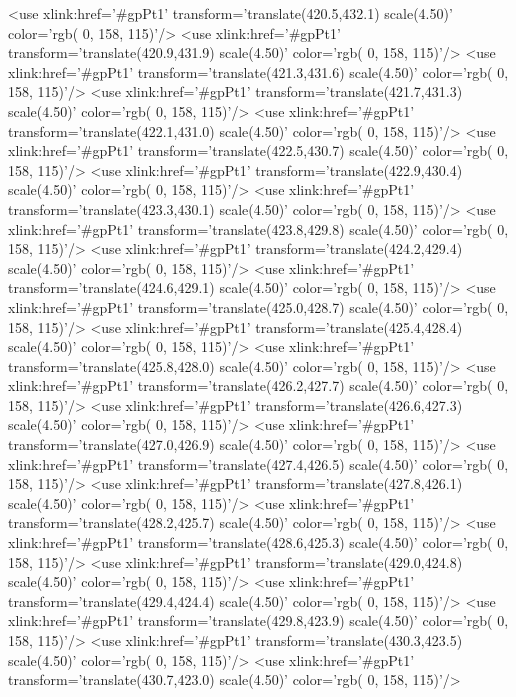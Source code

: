 	<use xlink:href='#gpPt1' transform='translate(420.5,432.1) scale(4.50)' color='rgb(  0, 158, 115)'/>
	<use xlink:href='#gpPt1' transform='translate(420.9,431.9) scale(4.50)' color='rgb(  0, 158, 115)'/>
	<use xlink:href='#gpPt1' transform='translate(421.3,431.6) scale(4.50)' color='rgb(  0, 158, 115)'/>
	<use xlink:href='#gpPt1' transform='translate(421.7,431.3) scale(4.50)' color='rgb(  0, 158, 115)'/>
	<use xlink:href='#gpPt1' transform='translate(422.1,431.0) scale(4.50)' color='rgb(  0, 158, 115)'/>
	<use xlink:href='#gpPt1' transform='translate(422.5,430.7) scale(4.50)' color='rgb(  0, 158, 115)'/>
	<use xlink:href='#gpPt1' transform='translate(422.9,430.4) scale(4.50)' color='rgb(  0, 158, 115)'/>
	<use xlink:href='#gpPt1' transform='translate(423.3,430.1) scale(4.50)' color='rgb(  0, 158, 115)'/>
	<use xlink:href='#gpPt1' transform='translate(423.8,429.8) scale(4.50)' color='rgb(  0, 158, 115)'/>
	<use xlink:href='#gpPt1' transform='translate(424.2,429.4) scale(4.50)' color='rgb(  0, 158, 115)'/>
	<use xlink:href='#gpPt1' transform='translate(424.6,429.1) scale(4.50)' color='rgb(  0, 158, 115)'/>
	<use xlink:href='#gpPt1' transform='translate(425.0,428.7) scale(4.50)' color='rgb(  0, 158, 115)'/>
	<use xlink:href='#gpPt1' transform='translate(425.4,428.4) scale(4.50)' color='rgb(  0, 158, 115)'/>
	<use xlink:href='#gpPt1' transform='translate(425.8,428.0) scale(4.50)' color='rgb(  0, 158, 115)'/>
	<use xlink:href='#gpPt1' transform='translate(426.2,427.7) scale(4.50)' color='rgb(  0, 158, 115)'/>
	<use xlink:href='#gpPt1' transform='translate(426.6,427.3) scale(4.50)' color='rgb(  0, 158, 115)'/>
	<use xlink:href='#gpPt1' transform='translate(427.0,426.9) scale(4.50)' color='rgb(  0, 158, 115)'/>
	<use xlink:href='#gpPt1' transform='translate(427.4,426.5) scale(4.50)' color='rgb(  0, 158, 115)'/>
	<use xlink:href='#gpPt1' transform='translate(427.8,426.1) scale(4.50)' color='rgb(  0, 158, 115)'/>
	<use xlink:href='#gpPt1' transform='translate(428.2,425.7) scale(4.50)' color='rgb(  0, 158, 115)'/>
	<use xlink:href='#gpPt1' transform='translate(428.6,425.3) scale(4.50)' color='rgb(  0, 158, 115)'/>
	<use xlink:href='#gpPt1' transform='translate(429.0,424.8) scale(4.50)' color='rgb(  0, 158, 115)'/>
	<use xlink:href='#gpPt1' transform='translate(429.4,424.4) scale(4.50)' color='rgb(  0, 158, 115)'/>
	<use xlink:href='#gpPt1' transform='translate(429.8,423.9) scale(4.50)' color='rgb(  0, 158, 115)'/>
	<use xlink:href='#gpPt1' transform='translate(430.3,423.5) scale(4.50)' color='rgb(  0, 158, 115)'/>
	<use xlink:href='#gpPt1' transform='translate(430.7,423.0) scale(4.50)' color='rgb(  0, 158, 115)'/>
